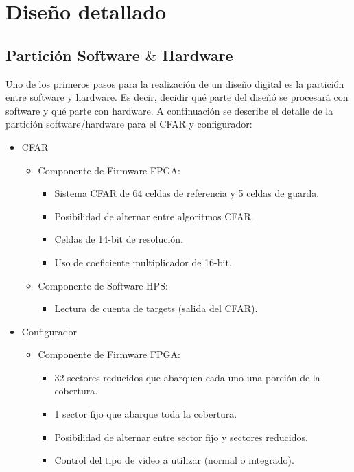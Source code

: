 \section{Diseño detallado}

\subsection{Partición Software $\&$ Hardware}
Uno de los primeros pasos para la realización de un diseño digital es la partición entre software y hardware. Es decir, decidir qué parte del diseñó se procesará con software y qué parte con hardware. A continuación se describe el detalle de la partición software/hardware para el CFAR y configurador:

\begin{itemize}
\item CFAR
	\begin{itemize}
	\item Componente de Firmware FPGA:
		\begin{itemize}
		\item Sistema CFAR de 64 celdas de referencia y 5 celdas de guarda.
		\item Posibilidad de alternar entre algoritmos CFAR.
		\item Celdas de 14-bit de resolución.
		\item Uso de coeficiente multiplicador de 16-bit.
		\end{itemize}
		
	\item Componente de Software HPS:
		\begin{itemize}
		\item Lectura de cuenta de targets (salida del CFAR).
		\end{itemize}
	
	\end{itemize}

\item Configurador
	\begin{itemize}
	\item Componente de Firmware FPGA:
		\begin{itemize}
		\item 32 sectores reducidos que abarquen cada uno una porción de la cobertura.
		\item 1 sector fijo que abarque toda la cobertura. 
		\item Posibilidad de alternar entre sector fijo y sectores reducidos.
		\item Control del tipo de video a utilizar (normal o integrado).
		\end{itemize}
	

\end{itemize}
\end{itemize}
